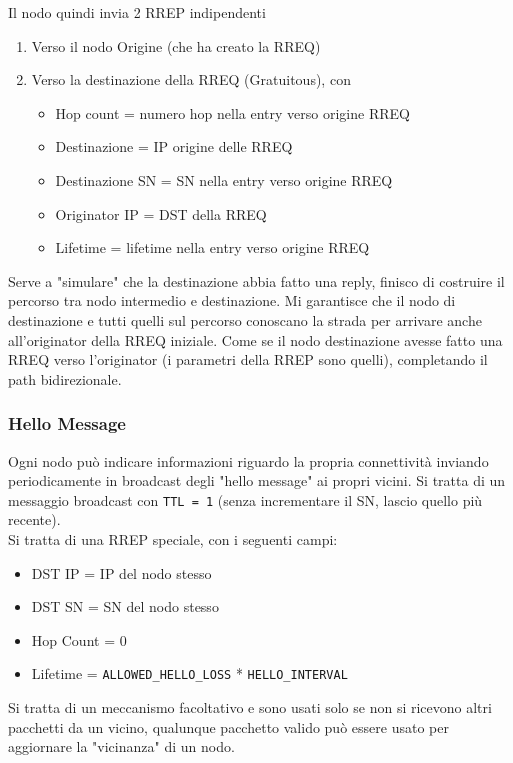 Il nodo quindi invia 2 RREP indipendenti
\begin{enumerate}
	\item Verso il nodo Origine (che ha creato la RREQ)
	\item Verso la destinazione della RREQ (Gratuitous), con 
	\begin{itemize}[noitemsep]
		\item Hop count = numero hop nella entry verso origine RREQ
		\item Destinazione = IP origine delle RREQ
		\item Destinazione SN = SN nella entry verso origine RREQ
		\item Originator IP = DST della RREQ
		\item Lifetime = lifetime nella entry verso origine RREQ
	\end{itemize}
\end{enumerate}

Serve a "simulare" che la destinazione abbia fatto una reply, finisco di costruire il percorso tra nodo intermedio e destinazione. Mi garantisce che il nodo di destinazione e tutti quelli sul percorso conoscano la strada per arrivare anche all'originator della RREQ iniziale. Come se il nodo destinazione avesse fatto una RREQ verso l'originator (i parametri della RREP sono quelli), completando il path bidirezionale.\\

\subsubsection{Hello Message}

Ogni nodo può indicare informazioni riguardo la propria connettività inviando periodicamente in broadcast degli "hello message" ai propri vicini. Si tratta di un messaggio broadcast con \texttt{TTL = 1} (senza incrementare il SN, lascio quello più recente). \\

Si tratta di una RREP speciale, con i seguenti campi: 
\begin{itemize}
	\item DST IP = IP del nodo stesso
	\item DST SN = SN del nodo stesso
	\item Hop Count = 0
	\item Lifetime = \texttt{ALLOWED\_HELLO\_LOSS} * \texttt{HELLO\_INTERVAL}
\end{itemize}

Si tratta di un meccanismo facoltativo e sono usati solo se non si ricevono altri pacchetti da un vicino, qualunque pacchetto valido può essere usato per aggiornare la "vicinanza" di un nodo.\\

